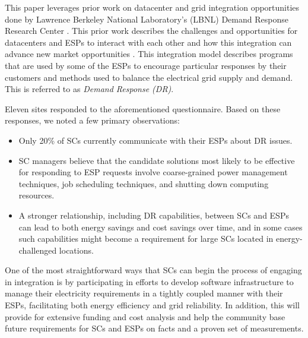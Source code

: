 This paper %
leverages prior work on datacenter and grid integration opportunities
done by Lawrence Berkeley National Laboratory's (LBNL) Demand Response 
Research Center \cite{LBNL}. This prior work describes the challenges and opportunities for datacenters and %
ESPs to interact with each other and how this integration can advance 
new market opportunities \cite{Ghatikar2012a, Ghatikar2012b}. 
This integration model describes programs that are used by some of the ESPs %
to encourage particular responses by their customers and methods 
used to balance the electrical grid supply and demand. This is referred to as \emph{Demand Response (DR)}.

Eleven sites responded to the aforementioned questionnaire. Based on these responses, we noted a few
primary observations:
\begin{itemize}
\item Only 20\% of SCs currently communicate with their ESPs about DR issues.
\item SC managers believe that the candidate solutions most likely to be effective for
responding to ESP requests involve coarse-grained power management techniques, job
scheduling techniques, and shutting down computing resources.
\item A stronger relationship, including DR capabilities, between SCs and
ESPs can lead to both energy savings and cost savings over time, and in some
cases such capabilities might become a requirement for large SCs located in energy-challenged
locations.
\end{itemize}


One of the most straightforward ways that SCs can begin
the process of engaging %
in integration is by participating in efforts to
develop software 
infrastructure to manage their electricity requirements in a tightly coupled manner 
with their ESPs, facilitating both energy efficiency and grid reliability. In addition, this will provide for extensive funding and cost analysis and help the community base future requirements for SCs and ESPs on facts and a proven set of measurements.

